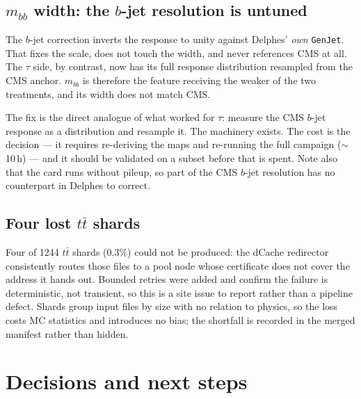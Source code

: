 \documentclass[11pt,a4paper]{article}
\begin{document}
\subsection{$m_{bb}$ width: the $b$-jet resolution is untuned}
\label{sec:mbb}

The $b$-jet correction inverts the response to unity against Delphes' \emph{own}
\texttt{GenJet}. That fixes the scale, does not touch the width, and never references CMS at
all. The $\tau$ side, by contrast, now has its full response distribution resampled from the
CMS anchor. $m_{bb}$ is therefore the feature receiving the weaker of the two treatments,
and its width does not match CMS.

The fix is the direct analogue of what worked for $\tau$: measure the CMS $b$-jet response
as a distribution and resample it. The machinery exists. The cost is the decision --- it
requires re-deriving the maps and re-running the full campaign ($\sim$10\,h) --- and it
should be validated on a subset before that is spent. Note also that the card runs without
pileup, so part of the CMS $b$-jet resolution has no counterpart in Delphes to correct.

\subsection{Four lost $t\bar t$ shards}
\label{sec:shards}

Four of 1244 $t\bar t$ shards ($0.3\%$) could not be produced: the dCache redirector
consistently routes those files to a pool node whose certificate does not cover the address
it hands out. Bounded retries were added and confirm the failure is deterministic, not
transient, so this is a site issue to report rather than a pipeline defect. Shards group
input files by size with no relation to physics, so the loss costs MC statistics and
introduces no bias; the shortfall is recorded in the merged manifest rather than hidden.

\section{Decisions and next steps}
\end{document}
